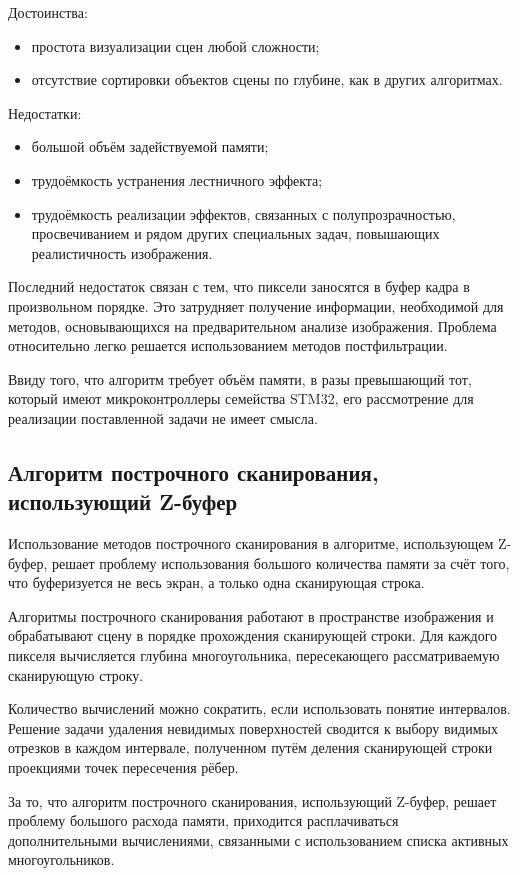 Достоинства:
\begin{itemize}
	\item простота визуализации сцен любой сложности;
	\item отсутствие сортировки объектов сцены по глубине, как в других алгоритмах.
\end{itemize}

Недостатки:
\begin{itemize}
	\item большой объём задействуемой памяти;
	\item трудоёмкость устранения лестничного эффекта;
	\item трудоёмкость реализации эффектов, связанных с полупрозрачностью, просвечиванием и рядом других специальных задач, повышающих реалистичность изображения.
\end{itemize}

Последний недостаток связан с тем, что пиксели заносятся в буфер кадра в произвольном порядке. Это затрудняет получение информации, необходимой для методов, основывающихся на предварительном анализе изображения. Проблема относительно легко решается использованием методов постфильтрации.

Ввиду того, что алгоритм требует объём памяти, в разы превышающий тот, который имеют микроконтроллеры семейства STM32, его рассмотрение для реализации поставленной задачи не имеет смысла.

\subsection{Алгоритм построчного сканирования, использующий Z-буфер}
Использование методов построчного сканирования в алгоритме, использующем Z-буфер, решает проблему использования большого количества памяти за счёт того, что буферизуется не весь экран, а только одна сканирующая строка.

Алгоритмы построчного сканирования работают в пространстве изображения и обрабатывают сцену в порядке прохождения сканирующей строки. Для каждого пикселя вычисляется глубина многоугольника, пересекающего рассматриваемую сканирующую строку. 

Количество вычислений можно сократить, если использовать понятие интервалов. Решение задачи удаления невидимых поверхностей сводится к выбору видимых отрезков в каждом интервале, полученном путём деления сканирующей строки проекциями точек пересечения рёбер.

За то, что алгоритм построчного сканирования, использующий Z-буфер, решает проблему большого расхода памяти, приходится расплачиваться дополнительными вычислениями, связанными с использованием списка активных многоугольников.

